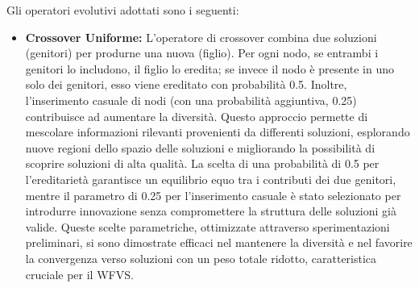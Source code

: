 \documentclass[12pt,a4paper,twoside]{article}
\begin{document}
Gli operatori evolutivi adottati sono i seguenti:
\begin{itemize}
    \item \textbf{Crossover Uniforme:} L'operatore di crossover combina due soluzioni (genitori) per produrne una nuova (figlio). Per ogni nodo, se entrambi i genitori lo includono, il figlio lo eredita; se invece il nodo è presente in uno solo dei genitori, esso viene ereditato con probabilità 0.5. Inoltre, l'inserimento casuale di nodi (con una probabilità aggiuntiva, 0.25) contribuisce ad aumentare la diversità. Questo approccio permette di mescolare informazioni rilevanti provenienti da differenti soluzioni, esplorando nuove regioni dello spazio delle soluzioni e migliorando la possibilità di scoprire soluzioni di alta qualità.  
La scelta di una probabilità di 0.5 per l'ereditarietà garantisce un equilibrio equo tra i contributi dei due genitori, mentre il parametro di 0.25 per l'inserimento casuale è stato selezionato per introdurre innovazione senza compromettere la struttura delle soluzioni già valide. Queste scelte parametriche, ottimizzate attraverso sperimentazioni preliminari, si sono dimostrate efficaci nel mantenere la diversità e nel favorire la convergenza verso soluzioni con un peso totale ridotto, caratteristica cruciale per il WFVS.


\end{itemize}
\end{document}
